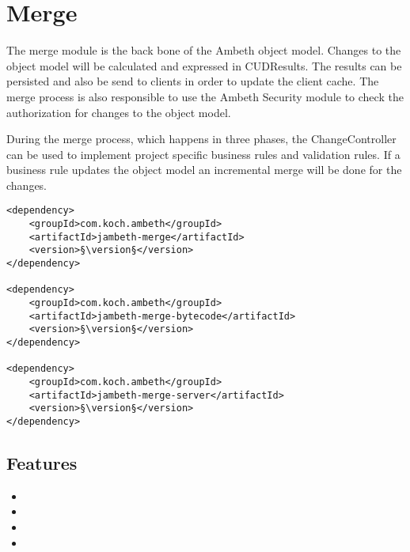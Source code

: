 \section{Merge}
\label{module:Merge}
\ClearAPI
The merge module is the back bone of the Ambeth object model. Changes to the object model will be calculated and expressed in CUDResults. The results can be persisted and also be send to clients in order to update the client cache. The merge process is also responsible to use the Ambeth Security module to check the authorization for changes to the object model.

During the merge process, which happens in three phases, the ChangeController can be used to implement project specific business rules and validation rules. If a business rule updates the object model an incremental merge will be done for the changes.

\TODO

\begin{lstlisting}[style=POM,caption={Maven modules to use \emph{Ambeth Merge}}]
<dependency>
	<groupId>com.koch.ambeth</groupId>
	<artifactId>jambeth-merge</artifactId>
	<version>§\version§</version>
</dependency>

<dependency>
	<groupId>com.koch.ambeth</groupId>
	<artifactId>jambeth-merge-bytecode</artifactId>
	<version>§\version§</version>
</dependency>

<dependency>
	<groupId>com.koch.ambeth</groupId>
	<artifactId>jambeth-merge-server</artifactId>
	<version>§\version§</version>
</dependency>
\end{lstlisting}
\subsection{Features}
\begin{itemize}
	\item {}
	\item {}
	\item {}
	\item {}
\end{itemize}

